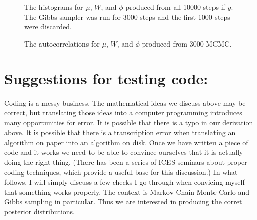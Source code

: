 \documentclass{article}
\begin{document}
\begin{figure}[!h]
\begin{center}
\end{center}
\label{DLM4:histograms}
\caption{The histograms for $\mu$, $W$, and $\phi$ produced from all 10000 steps if $y$.  The Gibbs sampler was run for 3000 steps and the first 1000 steps were discarded.}
\end{figure}

\begin{figure}[!h]
\begin{center}
\end{center}
\label{DLM4:histograms}
\caption{The autocorrelations for $\mu$, $W$, and $\phi$ produced from  3000 MCMC.}
\end{figure}

\section{Suggestions for testing code:}

Coding is a messy business.  The mathematical ideas we discuss above may be correct, but translating those ideas into a computer programming introduces many opportunities for error.  It is possible that there is a typo in our derivation above.  It is possible that there is a transcription error when translating an algorithm on paper into an algorithm on disk.  Once we have written a piece of code and it works we need to be able to convince ourselves that it is actually doing the right thing.  (There has been a series of ICES seminars about proper coding techniques, which provide a useful base for this discussion.)  In what follows, I will simply discuss a few checks I go through when convicing myself that something works properly.  The context is Markov-Chain Monte Carlo and Gibbs sampling in particular.  Thus we are interested in producing the corret posterior distributions.
\end{document}
